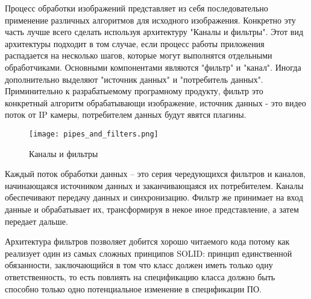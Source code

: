 Процесс обработки изображений представляет из себя последовательно применение различных алгоритмов для исходного изображения. Конкретно эту часть лучше всего сделать используя архитектуру "Каналы и фильтры". Этот вид архитектуры подходит в том случае, если процесс работы приложения распадается на несколько шагов, которые могут выполнятся отдельными обработчиками. Основными компонентами являются "фильтр" и "канал". Иногда дополнительно выделяют "источник данных" и "потребитель данных". Приминительно к разрабатыемому програмному продукту, фильтр это конкретный алгоритм обрабатывающи изображение, источник данных - это видео поток от IP камеры, потребителем данных будут явятся плагины.

\begin{figure}[ht] 
    \centering
    \texttt{[image: pipes\_and\_filters.png]}  
    \caption{Каналы и фильтры}
    \label{fig:arch_arch:pipes_and_filters}
\end{figure}

Каждый поток обработки данных – это серия чередующихся фильтров и каналов, начинающаяся источником данных и заканчивающаяся их потребителем. Каналы обеспечивают передачу данных и синхронизацию. Фильтр же принимает на вход данные и обрабатывает их, трансформируя в некое иное представление, а затем передает дальше.

Архитектура фильтров позволяет добится хорошо читаемого кода потому как реализует один из самых сложных принципов SOLID: принцип единственной обязанности, заключающийся в том что класс должен иметь только одну ответственность, то есть повлиять на спецификацию класса должно быть способно только одно потенциальное изменение в спецификации ПО. 